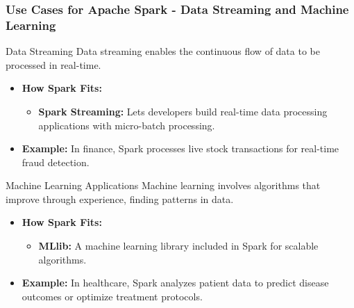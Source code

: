 \documentclass{beamer}
\begin{document}
\begin{frame}[fragile]
    \frametitle{Use Cases for Apache Spark - Data Streaming and Machine Learning}
    \begin{block}{Data Streaming}
        Data streaming enables the continuous flow of data to be processed in real-time.
    \end{block}
    \begin{itemize}
        \item \textbf{How Spark Fits:}
        \begin{itemize}
            \item \textbf{Spark Streaming:} Lets developers build real-time data processing applications with micro-batch processing.
        \end{itemize}
        \item \textbf{Example:} In finance, Spark processes live stock transactions for real-time fraud detection.
    \end{itemize}
    
    \vspace{0.5cm} %
    
    \begin{block}{Machine Learning Applications}
        Machine learning involves algorithms that improve through experience, finding patterns in data.
    \end{block}
    \begin{itemize}
        \item \textbf{How Spark Fits:}
        \begin{itemize}
            \item \textbf{MLlib:} A machine learning library included in Spark for scalable algorithms.
        \end{itemize}
        \item \textbf{Example:} In healthcare, Spark analyzes patient data to predict disease outcomes or optimize treatment protocols.
    \end{itemize}
\end{frame}
\end{document}
